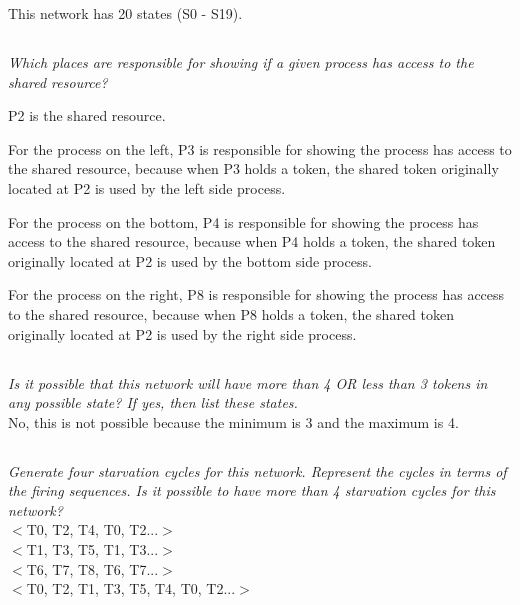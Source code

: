\documentclass[letterpaper]{article}
\begin{document}
This network has 20 states (S0 - S19).

\subsection{}
\textit{Which places are responsible for showing if a given process has access to the shared resource?}

P2 is the shared resource.

For the process on the left, P3 is responsible for showing the process has access
to the shared resource, because when P3 holds a token, the shared token originally
located at P2 is used by the left side process.

For the process on the bottom, P4 is responsible for showing the process has access
to the shared resource, because when P4 holds a token, the shared token originally
located at P2 is used by the bottom side process.

For the process on the right, P8 is responsible for showing the process has access
to the shared resource, because when P8 holds a token, the shared token originally
located at P2 is used by the right side process.

\subsection{}
\textit{Is it possible that this network will have more than 4 OR less than 3 tokens in any possible state?
 If yes, then list these states.
}\\

No, this is not possible because the minimum is 3 and the maximum is 4.

\subsection{}
\textit{Generate four starvation cycles for this network. Represent the cycles in terms of the firing sequences. Is it possible to have more than 4 starvation cycles for this network?}\\


$<$T0, T2, T4, T0, T2...$>$\\

$<$T1, T3, T5, T1, T3...$>$\\

$<$T6, T7, T8, T6, T7...$>$\\

$<$T0, T2, T1, T3, T5, T4, T0, T2...$>$\\
\end{document}
